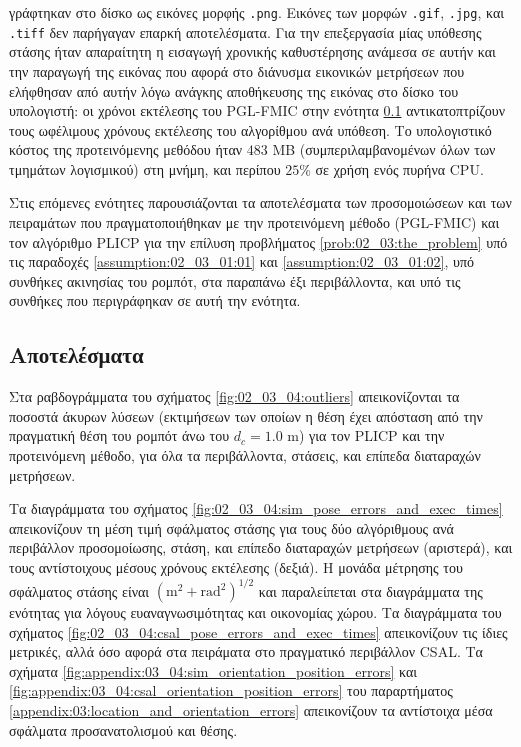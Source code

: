 γράφτηκαν στο δίσκο ως εικόνες μορφής \texttt{.png}. Εικόνες των μορφών
\texttt{.gif}, \texttt{.jpg}, και \texttt{.tiff} δεν παρήγαγαν επαρκή
αποτελέσματα.  Για την επεξεργασία μίας υπόθεσης στάσης ήταν απαραίτητη η
εισαγωγή χρονικής καθυστέρησης ανάμεσα σε αυτήν και την παραγωγή της εικόνας
που αφορά στο διάνυσμα εικονικών μετρήσεων που ελήφθησαν από αυτήν λόγω ανάγκης
αποθήκευσης της εικόνας στο δίσκο του υπολογιστή: οι χρόνοι εκτέλεσης του
PGL-FMIC στην ενότητα \ref{subsection:02_03_04:02} αντικατοπτρίζουν τους
ωφέλιμους χρόνους εκτέλεσης του αλγορίθμου ανά υπόθεση. Το υπολογιστικό κόστος
της προτεινόμενης μεθόδου ήταν $483$ MB (συμπεριλαμβανομένων όλων των τμημάτων
λογισμικού) στη μνήμη, και περίπου $25\%$ σε χρήση ενός πυρήνα CPU.

Στις επόμενες ενότητες παρουσιάζονται τα αποτελέσματα των προσομοιώσεων και των
πειραμάτων που πραγματοποιήθηκαν με την προτεινόμενη μέθοδο (PGL-FMIC) και τον
αλγόριθμο PLICP για την επίλυση προβλήματος \ref{prob:02_03:the_problem} υπό
τις παραδοχές \ref{assumption:02_03_01:01} και \ref{assumption:02_03_01:02},
υπό συνθήκες ακινησίας του ρομπότ, στα παραπάνω έξι περιβάλλοντα, και υπό τις
συνθήκες που περιγράφηκαν σε αυτή την ενότητα.

\subsection{Αποτελέσματα}
\label{subsection:02_03_04:02}

Στα ραβδογράμματα του σχήματος \ref{fig:02_03_04:outliers} απεικονίζονται τα
ποσοστά άκυρων λύσεων (εκτιμήσεων των οποίων η θέση έχει απόσταση από την
πραγματική θέση του ρομπότ άνω του $d_c = 1.0$ m) για τον PLICP και την
προτεινόμενη μέθοδο, για όλα τα περιβάλλοντα, στάσεις, και επίπεδα διαταραχών
μετρήσεων.

Τα διαγράμματα του σχήματος \ref{fig:02_03_04:sim_pose_errors_and_exec_times}
απεικονίζουν τη μέση τιμή σφάλματος στάσης για τους δύο αλγόριθμους
ανά περιβάλλον προσομοίωσης, στάση, και επίπεδο διαταραχών μετρήσεων
(αριστερά), και τους αντίστοιχους μέσους χρόνους εκτέλεσης (δεξιά). Η μονάδα
μέτρησης του σφάλματος στάσης είναι $(\text{m}^2 + \text{rad}^2)^{1/2}$ και
παραλείπεται στα διαγράμματα της ενότητας για λόγους ευαναγνωσιμότητας και
οικονομίας χώρου. Τα διαγράμματα του σχήματος
\ref{fig:02_03_04:csal_pose_errors_and_exec_times} απεικονίζουν τις ίδιες
μετρικές, αλλά όσο αφορά στα πειράματα στο πραγματικό περιβάλλον CSAL.
Τα σχήματα \ref{fig:appendix:03_04:sim_orientation_position_errors} και
\ref{fig:appendix:03_04:csal_orientation_position_errors} του παραρτήματος
\ref{appendix:03:location_and_orientation_errors} απεικονίζουν τα αντίστοιχα
μέσα σφάλματα προσανατολισμού και θέσης.

